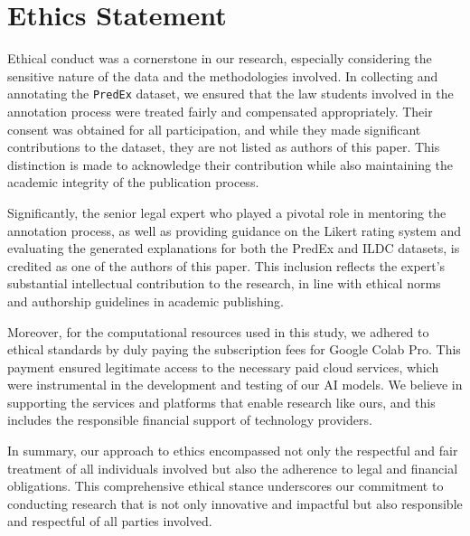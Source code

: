 \section*{Ethics Statement}
Ethical conduct was a cornerstone in our research, especially considering the sensitive nature of the data and the methodologies involved. In collecting and annotating the \texttt{PredEx} dataset, we ensured that the law students involved in the annotation process were treated fairly and compensated appropriately. Their consent was obtained for all participation, and while they made significant contributions to the dataset, they are not listed as authors of this paper. This distinction is made to acknowledge their contribution while also maintaining the academic integrity of the publication process.

Significantly, the senior legal expert who played a pivotal role in mentoring the annotation process, as well as providing guidance on the Likert rating system and evaluating the generated explanations for both the PredEx and ILDC datasets, is credited as one of the authors of this paper. This inclusion reflects the expert's substantial intellectual contribution to the research, in line with ethical norms and authorship guidelines in academic publishing.

Moreover, for the computational resources used in this study, we adhered to ethical standards by duly paying the subscription fees for Google Colab Pro. This payment ensured legitimate access to the necessary paid cloud services, which were instrumental in the development and testing of our AI models. We believe in supporting the services and platforms that enable research like ours, and this includes the responsible financial support of technology providers.

In summary, our approach to ethics encompassed not only the respectful and fair treatment of all individuals involved but also the adherence to legal and financial obligations. This comprehensive ethical stance underscores our commitment to conducting research that is not only innovative and impactful but also responsible and respectful of all parties involved.
